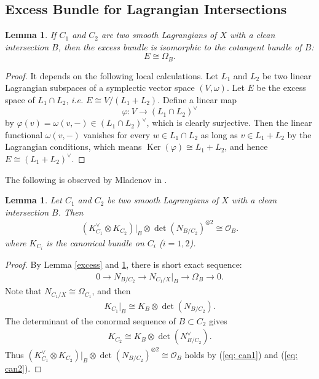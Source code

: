 \documentclass[12pt]{amsart}
\newtheorem{lemma}[theorem]{Lemma}
\theoremstyle{definition}
\theoremstyle{remark}
\numberwithin{equation}{section}
\newcommand{\shO}{\mathcal{O}}
\renewcommand{\ker}{\operatorname{Ker}} %
\newcommand{\arw}{\longrightarrow}
\begin{document}
\subsection{Excess Bundle for Lagrangian Intersections}
\begin{lemma}\label{exc}
    If $C_1$ and $C_2$ are two smooth Lagrangians of $X$ with a clean intersection $B$, then the excess bundle is isomorphic to the cotangent bundle of $B$: $$E\cong  \Omega_{B}.$$
\end{lemma} 
\begin{proof}
It depends on the following local calculations. 
    Let $L_1$ and $L_2$ be two linear Lagrangian subspaces of a symplectic vector space $(V,\omega)$. Let $E$ be the excess space of $L_1\cap L_2$, \emph{i.e.} $E\cong V/(L_1+L_2)$.
    Define a linear map 
    $$\varphi: V\arw (L_1\cap L_2)^{\vee}$$ 
    by $\varphi(v)=\omega(v,-)\in (L_1\cap L_2)^{\vee}$, which is clearly surjective. Then the linear functional $\omega(v,-)$ vanishes for every $w\in L_1\cap L_2$ as long as $v\in L_1+L_2$ by the Lagrangian conditions, which means $\ker(\varphi)\cong L_1+L_2$, and hence $E\cong (L_1+L_2)^{\vee}$.
\end{proof}
The following is observed by Mladenov in \cite{mladenov2024formality}. 
\begin{lemma}\label{lem: canlag}
Let $C_1$ and $C_2$ be two smooth Lagrangians of $X$ with a clean intersection $B$. Then
\begin{align*}
    (K_{C_1}^{\vee}\otimes K_{C_2})|_B\otimes \det(N_{B/C_2})^{\otimes2}\cong \shO_B.
\end{align*}
    where $K_{C_i}$ is the canonical bundle on $C_i$ ($i=1, 2$).
\end{lemma}
\begin{proof}
    By Lemma \ref{excess} and \ref{exc}, there is short exact sequence:
    \begin{align*}
        0\arw N_{B/C_2} \arw N_{C_1/X}|_B\arw \Omega_B\arw 0.
    \end{align*}
    Note that $N_{C_1/X}\cong \Omega_{C_1}$, and then
    \begin{align}\label{eq: can1}
        K_{C_1}|_B\cong K_B\otimes \det(N_{B/C_2}).
    \end{align}
    The determinant of the conormal sequence of $B\subset C_2$ gives
    \begin{align}\label{eq: can2}
        K_{C_2}\cong K_B\otimes \det(N_{B/C_2}^{\vee}).
    \end{align}
    Thus $(K_{C_1}^{\vee}\otimes K_{C_2})|_B\otimes \det(N_{B/C_2})^{\otimes2}\cong \shO_B$ holds by (\ref{eq: can1}) and (\ref{eq: can2}).
\end{proof}
\end{document}
